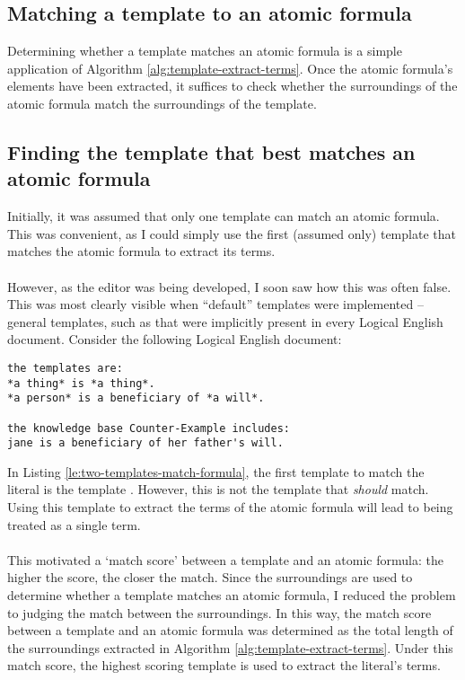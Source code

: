 \documentclass[../main.tex]{subfiles}
\begin{document}
\subsection{Matching a template to an atomic formula}
\label{section:matching-template-formula}
Determining whether a template matches an atomic formula is a simple application of Algorithm \ref{alg:template-extract-terms}. Once the atomic formula's elements have been extracted, it suffices to check whether the surroundings of the atomic formula match the surroundings of the template.

\subsection{Finding the template that best matches an atomic formula}
Initially, it was assumed that only one template can match an atomic formula. This was convenient, as I could simply use the first (assumed only) template that matches the atomic formula to extract its terms. 
\\
\\
However, as the editor was being developed, I soon saw how this was often false. This was most clearly visible when ``default'' templates were implemented -- general templates, such as  that were implicitly present in every Logical English document. Consider the following Logical English document:
\begin{lstlisting}[language={LE}, caption={A Logical English document containing two templates that both match an atomic formula.}, label={le:two-templates-match-formula}]
the templates are:
*a thing* is *a thing*.
*a person* is a beneficiary of *a will*.

the knowledge base Counter-Example includes:
jane is a beneficiary of her father's will.
\end{lstlisting}
In Listing \ref{le:two-templates-match-formula}, the first template to match the literal  is the template . However, this is not the template that \textit{should} match. Using this template to extract the terms of the atomic formula  will lead to  being treated as a single term.
\\ 
\\
This motivated a `match score' between a template and an atomic formula: the higher the score, the closer the match. Since the surroundings are used to determine whether a template matches an atomic formula, I reduced the problem to judging the match between the surroundings. In this way, the match score between a template and an atomic formula was determined as the total length of the surroundings extracted in Algorithm \ref{alg:template-extract-terms}. Under this match score, the highest scoring template is used to extract the literal's terms.
%
%
%
\end{document}
